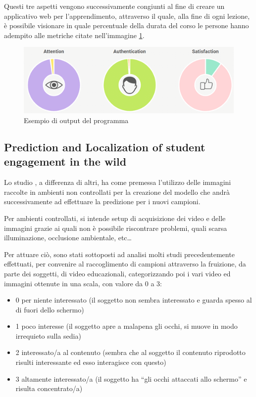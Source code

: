 Questi tre aspetti vengono successivamente congiunti al fine di creare un applicativo web per l’apprendimento, attraverso il quale, alla fine di ogni lezione, è possibile visionare in quale percentuale della durata del corso le persone hanno adempito alle metriche citate nell'immagine \ref{fig:image32}.

\begin{figure}
    \begin{center}    
        \includegraphics[width=1\linewidth]{images/3.png}
        \caption{Esempio di output del programma}
        \label{fig:image32}
    \end{center}
\end{figure}
 
\subsection{Prediction and Localization of student engagement in the wild}

Lo studio \cite{PredLocStudEngagInTheWild}, a differenza di altri, ha come premessa l’utilizzo delle immagini raccolte in ambienti non controllati per la creazione del modello che andrà successivamente ad effettuare la predizione per i nuovi campioni.

Per ambienti controllati, si intende setup di acquisizione dei video e delle immagini grazie ai quali non è possibile riscontrare problemi, quali scarsa illuminazione, occlusione ambientale, etc…

Per attuare ciò, sono stati sottoposti ad analisi molti studi precedentemente effettuati, per convenire al raccoglimento di campioni attraverso la fruizione, da parte dei soggetti, di video educazionali, categorizzando poi i vari video ed immagini ottenute in una scala, con valore da 0 a 3:
\begin{itemize}
    \item 0 \textrightarrow per niente interessato (il soggetto non sembra interessato e guarda spesso al di fuori dello schermo)
    \item 1 \textrightarrow poco interesse (il soggetto apre a malapena gli occhi, si muove in modo irrequieto sulla sedia)
    \item 2 \textrightarrow interessato/a al contenuto (sembra che al soggetto il contenuto riprodotto risulti interessante ed esso interagisce con questo)
    \item 3 \textrightarrow altamente interessato/a (il soggetto ha “gli occhi attaccati allo schermo” e risulta concentrato/a)
\end{itemize}



